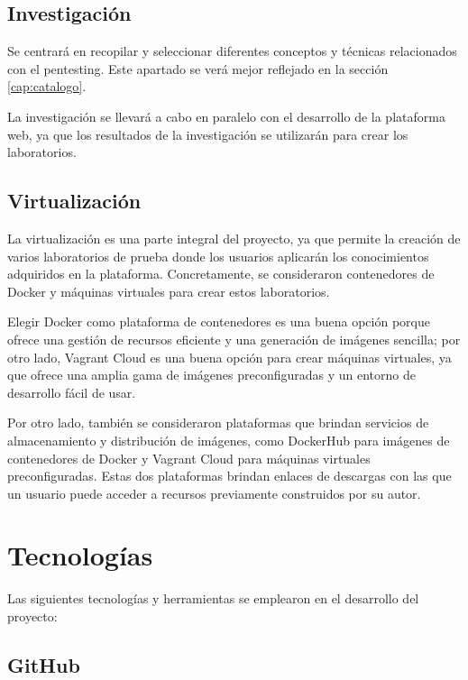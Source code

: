        \subsection{Investigación}
        
            Se centrará en recopilar y seleccionar diferentes conceptos y técnicas relacionados con el pentesting. Este apartado se verá mejor reflejado en la sección \ref{cap:catalogo}.

            La investigación se llevará a cabo en paralelo con el desarrollo de la plataforma web, ya que los resultados de la investigación se utilizarán para crear los laboratorios.
        
        \subsection{Virtualización}

            La virtualización es una parte integral del proyecto, ya que permite la creación de varios laboratorios de prueba donde los usuarios aplicarán los conocimientos adquiridos en la plataforma. Concretamente, se consideraron contenedores de Docker y máquinas virtuales para crear estos laboratorios.
            
            Elegir Docker como plataforma de contenedores es una buena opción porque ofrece una gestión de recursos eficiente y una generación de imágenes sencilla; por otro lado, Vagrant Cloud es una buena opción para crear máquinas virtuales, ya que ofrece una amplia gama de imágenes preconfiguradas y un entorno de desarrollo fácil de usar.
            
            Por otro lado, también se consideraron plataformas que brindan servicios de almacenamiento y distribución de imágenes, como DockerHub para imágenes de contenedores de Docker y Vagrant Cloud para máquinas virtuales preconfiguradas. Estas dos plataformas brindan enlaces de descargas con las que un usuario puede acceder a recursos previamente construidos por su autor.

            \newpage

            
    \section{Tecnologías}
    
        Las siguientes tecnologías y herramientas se emplearon en el desarrollo del proyecto:
        
        \subsection{GitHub}
        
